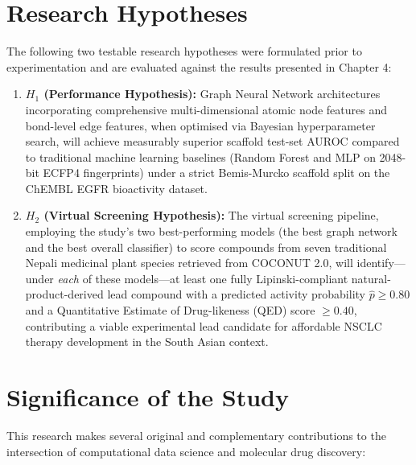\section{Research Hypotheses}

The following two testable research hypotheses were formulated prior to
experimentation and are evaluated against the results presented in Chapter 4:

\begin{enumerate}
    \item \textbf{$H_1$ (Performance Hypothesis):} Graph Neural Network architectures
    incorporating comprehensive multi-dimensional atomic node features and bond-level
    edge features, when optimised via Bayesian hyperparameter search, will achieve
    measurably superior scaffold test-set AUROC compared to traditional machine learning
    baselines (Random Forest and MLP on 2048-bit ECFP4 fingerprints)
    under a strict Bemis-Murcko scaffold split on the ChEMBL EGFR bioactivity dataset.

    \item \textbf{$H_2$ (Virtual Screening Hypothesis):} The virtual screening
    pipeline, employing the study's two best-performing models (the best graph network
    and the best overall classifier) to score compounds from seven traditional Nepali
    medicinal plant species retrieved from COCONUT 2.0, will identify---under
    \emph{each} of these models---at least one fully Lipinski-compliant
    natural-product-derived lead compound with a predicted activity probability
    $\hat{p} \geq 0.80$ and a Quantitative Estimate of Drug-likeness (QED) score
    $\geq 0.40$, contributing a viable experimental lead candidate for affordable NSCLC
    therapy development in the South Asian context.
\end{enumerate}

\section{Significance of the Study}

This research makes several original and complementary contributions to the
intersection of computational data science and molecular drug discovery:

